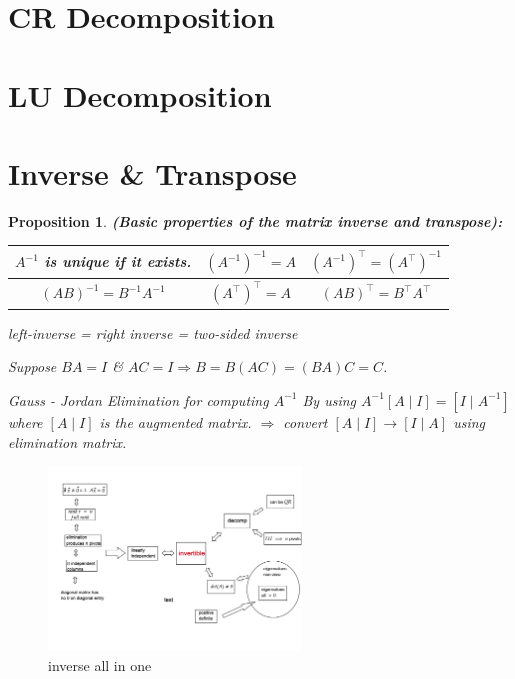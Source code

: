 \documentclass[13pt]{article}
\newtheorem{proposition}[theorem]{Proposition}
\theoremstyle{definition}
\theoremstyle{remark}
\begin{document}
\section{CR Decomposition}


\headrule

\section{LU Decomposition}



\headrule

\section{Inverse \& Transpose}
\begin{proposition}
    \textbf{(Basic properties of the matrix inverse and transpose): } 
    
    \begin{tabular}{c|c|c}
         $A^{-1}$ is unique if it exists. & $\left(A^{-1}\right)^{-1}=A$ & $\left(A^{-1}\right)^{\top}=\left(A^{\top}\right)^{-1}$\\\hline
         $(A B)^{-1}=B^{-1} A^{-1}$ & $\left(A^{\top}\right)^{\top}=A$ & $(A B)^{\top}=B^{\top} A^{\top}$
    \end{tabular}
    
left-inverse = right inverse = two-sided inverse

Suppose $B A=I$ \& $A C=I \Rightarrow B=B(A C)=(B A) C=C$.

Gauss - Jordan Elimination for computing $A^{-1}$ By using $A^{-1}[A \mid I]=\left[I \mid A^{-1}\right]$
where $[A \mid I]$ is the augmented matrix.
$\Rightarrow$ convert $[A \mid I] \rightarrow[I \mid A]$ using elimination matrix.


\end{proposition}
\begin{figure}[!htp]
    \centering
    \includegraphics[width=0.6\textwidth]{inverse.png}
    \caption{inverse all in one}
    \label{fig:enter-label}
\end{figure}
\end{document}
